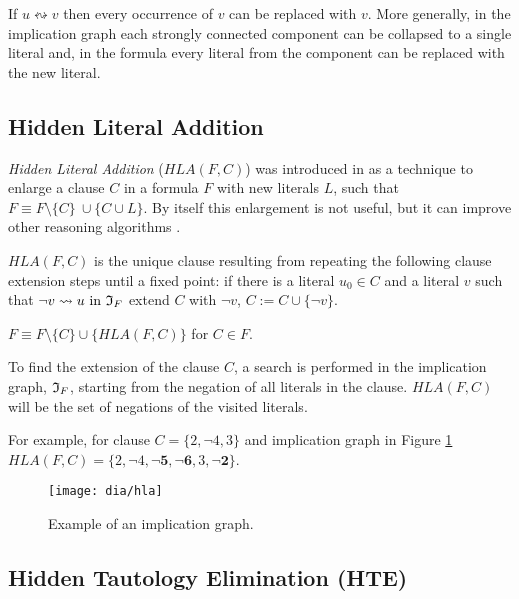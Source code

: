 \begin{myprop}
  If $u \leftrightsquigarrow v$ then every occurrence of $v$ can be replaced
  with $v$. More generally, in the implication graph each strongly
  connected component can be collapsed to a single literal and, in
  the formula every literal from the component can be replaced with
  the new literal.
\end{myprop}


\subsection{Hidden Literal Addition}
\label{ssec:hla}

\emph{Hidden Literal Addition} ($HLA(F, C)$) was introduced in
\cite{mine:hjb_efficient} as a technique to enlarge a clause $C$
in a formula $F$ with new literals $L$, such that $F \equiv F \setminus \{C\} \
\cup \{ C \cup L \}$. By itself this enlargement is not useful, but it
can improve other reasoning algorithms \cite{Heule:2010:CEP:1928380.1928406, Heule_coveredclause}.

\begin{mydef}
  $HLA(F, C)$ is the unique clause resulting from repeating the following
  clause extension steps until a fixed point: if there is a literal $u_0 \in C$
  and a literal $v$ such that $\neg v \rightsquigarrow u \text{ in } \mathfrak{I}_F$
  extend $C$ with $\neg v$, $C := C \cup \{ \neg v \}$.
\end{mydef}

\begin{myprop}
  $F \equiv F \setminus \{C\} \cup \{HLA(F, C)\}$ for $C \in F$.
\end{myprop}

To find the extension of the clause $C$, a search is performed in
the implication graph, $\mathfrak{I}_F$, starting from the negation of all
literals in the clause. $HLA(F, C)$ will be the set of negations
of the visited literals.

For example, for clause $C = \{ 2, \neg 4, 3\}$
and implication graph in Figure \ref{fig:hla}
$HLA(F, C) = \{2, \neg 4, \mathbf{\neg 5, \neg 6}, 3, \mathbf{\neg 2} \}$.

\begin{figure}
  \centering
  \texttt{[image: dia/hla]}
  \caption{Example of an implication graph.}
  \label{fig:hla}
\end{figure}


\subsection{Hidden Tautology Elimination (HTE)}
\label{ssec:hte}

